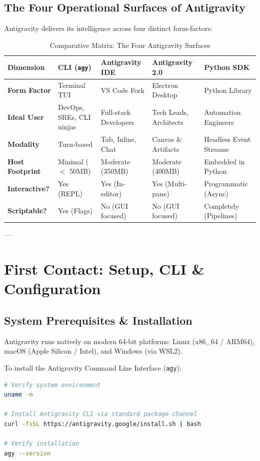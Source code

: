 \documentclass[11pt,a4paper,oneside]{book}
\begin{document}
\section{The Four Operational Surfaces of Antigravity}
Antigravity delivers its intelligence across four distinct form-factors:

\begin{table}[htbp]
\centering
\caption{Comparative Matrix: The Four Antigravity Surfaces}
\begin{tabularx}{\textwidth}{lXXXX}
\toprule
\textbf{Dimension} & \textbf{CLI (\texttt{agy})} & \textbf{Antigravity IDE} & \textbf{Antigravity 2.0} & \textbf{Python SDK} \\
\midrule
\textbf{Form Factor} & Terminal TUI & VS Code Fork & Electron Desktop & Python Library \\
\textbf{Ideal User} & DevOps, SREs, CLI ninjas & Full-stack Developers & Tech Leads, Architects & Automation Engineers \\
\textbf{Modality} & Turn-based & Tab, Inline, Chat & Canvas \& Artifacts & Headless Event Streams \\
\textbf{Host Footprint} & Minimal ($<$ 50MB) & Moderate (350MB) & Moderate (400MB) & Embedded in Python \\
\textbf{Interactive?} & Yes (REPL) & Yes (In-editor) & Yes (Multi-pane) & Programmatic (Async) \\
\textbf{Scriptable?} & Yes (Flags) & No (GUI focused) & No (GUI focused) & Completely (Pipelines) \\
\bottomrule
\end{tabularx}
\end{table}

---

\chapter{First Contact: Setup, CLI \& Configuration}

\section{System Prerequisites \& Installation}
Antigravity runs natively on modern 64-bit platforms: Linux (x86\_64 / ARM64), macOS (Apple Silicon / Intel), and Windows (via WSL2).

To install the Antigravity Command Line Interface (\texttt{agy}):
\begin{lstlisting}[language=bash, caption={Installing and verifying the Antigravity CLI}]
# Verify system environment
uname -m

# Install Antigravity CLI via standard package channel
curl -fsSL https://antigravity.google/install.sh | bash

# Verify installation
agy --version
\end{lstlisting}
\end{document}
